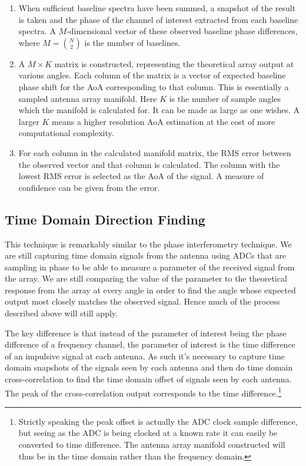 \begin{enumerate}
  \item When sufficient baseline spectra have been summed, a snapshot of the result is taken and the phase of the channel of interest extracted from each baseline spectra. A \(M\)-dimensional vector of these observed baseline phase differences, where \(M = {N \choose 2}\) is the number of baselines.
  \item A \(M \times K\) matrix is constructed, representing the theoretical array output at various angles. Each column of the matrix is a vector of expected baseline phase shift for the AoA corresponding to that column. This is essentially a sampled antenna array manifold. Here \(K\) is the number of sample angles which the manifold is calculated for. It can be made as large as one wishes. A larger \(K\) means a higher resolution AoA estimation at the cost of more computational complexity.
  \item For each column in the calculated manifold matrix, the RMS error between the observed vector and that column is calculated. The column with the lowest RMS error is selected as the AoA of the signal. A measure of confidence can be given from the error.
\end{enumerate}

\subsection{Time Domain Direction Finding}
This technique is remarkably similar to the phase interferometry technique. We are still capturing time domain signals from the antenna using ADCs that are sampling in phase to be able to measure a parameter of the received signal from the array. We are still comparing the value of the parameter to the theoretical response from the array at every angle in order to find the angle whose expected output most closely matches the observed signal. Hence much of the process described above will still apply.

The key difference is that instead of the parameter of interest being the phase difference of a frequency channel, the parameter of interest is the time difference of an impulsive signal at each antenna. As such it's necessary to capture time domain snapshots of the signals seen by each antenna and then do time domain cross-correlation to find the time domain offset of signals seen by each antenna. The peak of the cross-correlation output corresponds to the time difference.\footnote{Strictly speaking the peak offset is actually the ADC clock sample difference, but seeing as the ADC is being clocked at a known rate it can easily be converted to time difference. The antenna array manifold constructed will thus be in the time domain rather than the frequency domain.}

